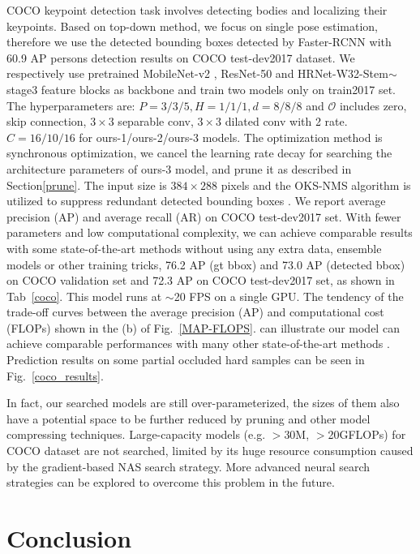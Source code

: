 \documentclass[journal]{IEEEtran}
\begin{document}
\label{cocotest}
COCO keypoint detection task involves detecting bodies and localizing their keypoints. Based on top-down method, we focus on single pose estimation, therefore we use the detected bounding boxes detected by Faster-RCNN \cite{ren2015faster} with 60.9 AP persons detection results on COCO test-dev2017 dataset. We respectively use pretrained MobileNet-v2 \cite{Sandler2018MobileNetV2IR}, ResNet-50 \cite{he2016deep} and HRNet-W32-Stem$\sim$stage3 \cite{Sun_2019_CVPR} feature blocks as backbone and train two models only on train2017 set. The hyperparameters are: $P=3/3/5,H=1/1/1,d=8/8/8$ and $\mathcal{O}$ includes zero, skip connection, $3\times3$ separable conv, $3\times3$ dilated conv with 2 rate. $C=16/10/16$ for ours-1/ours-2/ours-3 models. The optimization method is synchronous optimization, we cancel the learning rate decay for searching the architecture parameters of ours-3 model, and prune it as described in Section\ref{prune}. The input size is $384\times288$ pixels and the OKS-NMS algorithm \cite{papandreou2017towards} is utilized to suppress redundant detected bounding boxes . We report average precision (AP) and average recall (AR) on COCO test-dev2017 set.  With fewer parameters and low computational complexity, we can achieve comparable results with some state-of-the-art methods without using any extra data, ensemble models or other training tricks, 76.2 AP (gt bbox)  and 73.0 AP (detected bbox) on COCO validation set and 72.3 AP on COCO test-dev2017 set, as shown in Tab~\ref{coco}. This model runs at $\sim$20 FPS on a single GPU. The tendency of the trade-off curves between the average precision (AP) and computational cost (FLOPs) shown in the (b) of Fig.~\ref{MAP-FLOPS}. can illustrate our model can achieve comparable performances with many other state-of-the-art methods \cite{fang2017rmpe, xiao2018simple, chen2018cascaded}. Prediction results on some partial occluded hard samples can be seen in Fig.~\ref{coco_results}.

In fact, our searched models are still over-parameterized, the sizes of them also have a potential space to be further reduced by pruning and other model compressing techniques. Large-capacity models (e.g. $>$30M, $>$20GFLOPs) for COCO dataset are not searched, limited by its huge resource consumption caused by the gradient-based NAS search strategy. More advanced neural search strategies can be explored to overcome this problem in the future.

\section{Conclusion}
\end{document}
